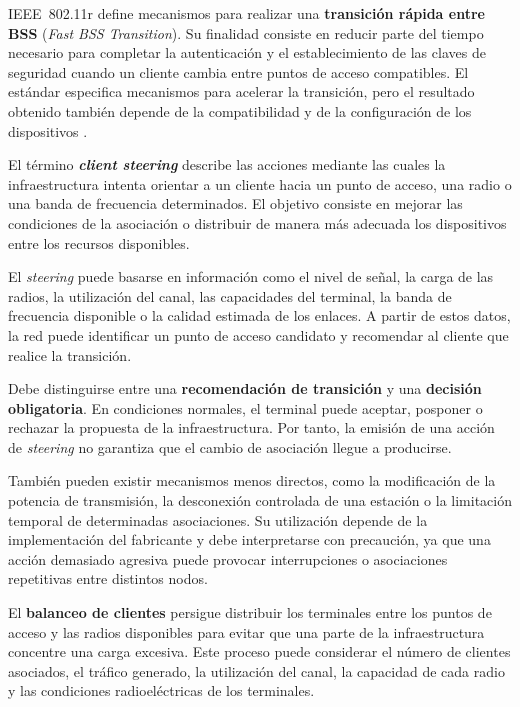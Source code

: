IEEE~802.11r define mecanismos para realizar una
\textbf{transición rápida entre BSS}
(\textit{Fast BSS Transition}). Su finalidad consiste en reducir parte
del tiempo necesario para completar la autenticación y el establecimiento
de las claves de seguridad cuando un cliente cambia entre puntos de
acceso compatibles. El estándar especifica mecanismos para acelerar la
transición, pero el resultado obtenido también depende de la
compatibilidad y de la configuración de los dispositivos
\cite{ieee_80211_2024}.

El término \textbf{\textit{client steering}} describe las acciones
mediante las cuales la infraestructura intenta orientar a un cliente
hacia un punto de acceso, una radio o una banda de frecuencia
determinados. El objetivo consiste en mejorar las condiciones de la
asociación o distribuir de manera más adecuada los dispositivos entre
los recursos disponibles.

El \textit{steering} puede basarse en información como el nivel de señal,
la carga de las radios, la utilización del canal, las capacidades del
terminal, la banda de frecuencia disponible o la calidad estimada de los
enlaces. A partir de estos datos, la red puede identificar un punto de
acceso candidato y recomendar al cliente que realice la transición.

Debe distinguirse entre una \textbf{recomendación de transición} y una
\textbf{decisión obligatoria}. En condiciones normales, el terminal
puede aceptar, posponer o rechazar la propuesta de la infraestructura.
Por tanto, la emisión de una acción de \textit{steering} no garantiza que
el cambio de asociación llegue a producirse.

También pueden existir mecanismos menos directos, como la modificación
de la potencia de transmisión, la desconexión controlada de una estación
o la limitación temporal de determinadas asociaciones. Su utilización
depende de la implementación del fabricante y debe interpretarse con
precaución, ya que una acción demasiado agresiva puede provocar
interrupciones o asociaciones repetitivas entre distintos nodos.

El \textbf{balanceo de clientes} persigue distribuir los terminales entre
los puntos de acceso y las radios disponibles para evitar que una parte
de la infraestructura concentre una carga excesiva. Este proceso puede
considerar el número de clientes asociados, el tráfico generado, la
utilización del canal, la capacidad de cada radio y las condiciones
radioeléctricas de los terminales.

